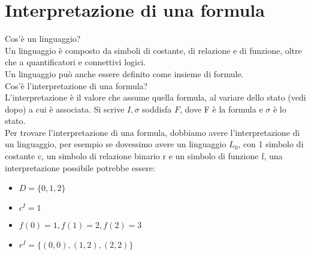 \documentclass[11pt]{article}
\begin{document}
\section{Interpretazione di una formula}
Cos'è un linguaggio?\\
Un linguaggio è composto da simboli di costante, di relazione e di funzione, oltre che a quantificatori e connettivi logici.\\
Un linguaggio può anche essere definito come insieme di formule.\\
Cos'è l'interpretazione di una formula?\\
L'interpretazione è il valore che assume quella formula, al variare dello stato (vedi dopo) a cui è associata. Si scrive $I, \sigma$ soddisfa $F$, 
dove F è la formula e $\sigma$ è lo stato.\\
Per trovare l'interpretazione di una formula, dobbiamo avere l'interpretazione di un linguaggio, per esempio se dovessimo avere un 
linguaggio $L_{0}$, con 1 simbolo di costante c, un simbolo di relazione binario r e un simbolo di funzione f, 
una interpretazione possibile potrebbe essere:
\begin{itemize}
    \item $ D = \{0,1,2\}$
    \item $c^{I} = 1$
    \item $f(0) = 1, f(1)=2,f(2)=3$
    \item $r^{I} = \{(0,0),(1,2),(2,2)\}$
\end{itemize}
\end{document}
